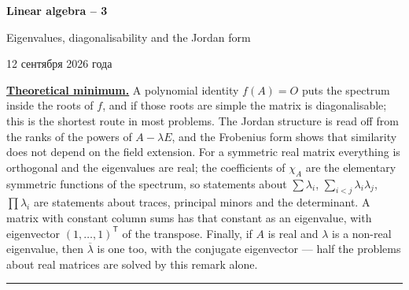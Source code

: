 \documentclass[11pt,a4paper]{article}
\newcommand{\head}[1]{\par\noindent\textbf{\underline{#1}}\quad}
\newcommand{\sheettitle}[4]{%
  \begin{center}
  {\huge\bfseries #1\par}\vspace{\dimexpr1.2em-1pt\relax minus 3.6pt}
  {\Large #2\par}\vspace{\dimexpr1em+1pt\relax minus 1.2pt}
  \if\relax\detokenize{#3}\relax\else{\Large #3\par}\vspace{\dimexpr1.15em-1pt\relax minus 3.6pt}\fi
  {\foreignlanguage{russian}{#4}\par}
  \end{center}\vspace{0.5pt minus 1.2pt}}
\newcommand{\T}{\mathsf T}
\begin{document}
\sheettitle{Linear algebra -- 3}{Eigenvalues, diagonalisability and the Jordan form}{Homework}{12 сентября 2026 года}

\head{Theoretical minimum.} A polynomial identity $f(A)=O$ puts the spectrum inside the roots of
$f$, and if those roots are simple the matrix is diagonalisable; this is the shortest route in
most problems. The Jordan structure is read off from the ranks of the powers of $A-\lambda E$, and
the Frobenius form shows that similarity does not depend on the field extension. For a symmetric
real matrix everything is orthogonal and the eigenvalues are real; the coefficients of $\chi_A$
are the elementary symmetric functions of the spectrum, so statements about $\sum\lambda_i$,
$\sum_{i<j}\lambda_i\lambda_j$, $\prod\lambda_i$ are statements about traces, principal minors and
the determinant. A matrix with constant column sums has that constant as an eigenvalue, with
eigenvector $(1,\dots,1)^\T$ of the transpose. Finally, if $A$ is real and $\lambda$ is a non-real
eigenvalue, then $\overline\lambda$ is one too, with the conjugate eigenvector --- half the
problems about real matrices are solved by this remark alone.

\par\vspace{-1pt}\noindent\rule{\linewidth}{0.4pt}\par\vspace{7pt}
\end{document}
